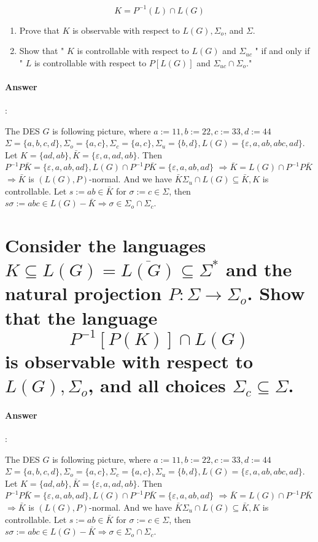 \documentclass{article}
\begin{document}
$$
K=P^{-1}(L) \cap L(G)
$$

\begin{enumerate}
  \item Prove that $K$ is observable with respect to $L(G), \Sigma_o$, and $\Sigma$.
  \item Show that " $K$ is controllable with respect to $L(G)$ and $\Sigma_{u c}$ " if and only if " $L$ is controllable with respect to $P[L(G)]$ and $\Sigma_{u c} \cap \Sigma_o$."
\end{enumerate}

\paragraph{Answer}:

The DES $G$ is following picture, where $a:=11, b:=22, c:=33, d:=44$ $\Sigma=\{a, b, c, d\}, \Sigma_o=\{a, c\}, \Sigma_c=\{a, c\}, \Sigma_u=\{b, d\}, L(G)=\{\varepsilon, a, a b, a b c, a d\}$. Let $K=\{a d, a b\}, \bar{K}=\{\varepsilon, a, a d, a b\}$.
Then $P^{-1} P \bar{K}=\{\varepsilon, a, a b, a d\}, L(G) \cap P^{-1} P \bar{K}=\{\varepsilon, a, a b, a d\}$
$\Longrightarrow \bar{K}=L(G) \cap P^{-1} P \bar{K}$
$\Longrightarrow \bar{K}$ is $(L(G), P)$-normal.
And we have $\bar{K} \Sigma_u \cap L(G) \subseteq \bar{K}, K$ is controllable. Let $s:=a b \in \bar{K}$ for $\sigma:=c \in \Sigma$, then $s \sigma:=a b c \in L(G)-\bar{K} \Longrightarrow \sigma \in \Sigma_o \cap \Sigma_c$.

\section{Consider the languages $K \subseteq L(G)=\overline{L(G)} \subseteq \Sigma^*$ and the natural projection $P: \Sigma \rightarrow \Sigma_o$. Show that the language
$$
P^{-1}[P(K)] \cap L(G)
$$
is observable with respect to $L(G), \Sigma_o$, and all choices $\Sigma_c \subseteq \Sigma$.}

\paragraph{Answer}:

The DES $G$ is following picture, where $a:=11, b:=22, c:=33, d:=44$ $\Sigma=\{a, b, c, d\}, \Sigma_o=\{a, c\}, \Sigma_c=\{a, c\}, \Sigma_u=\{b, d\}, L(G)=\{\varepsilon, a, a b, a b c, a d\}$. Let $K=\{a d, a b\}, \bar{K}=\{\varepsilon, a, a d, a b\}$.
Then $P^{-1} P \bar{K}=\{\varepsilon, a, a b, a d\}, L(G) \cap P^{-1} P \bar{K}=\{\varepsilon, a, a b, a d\}$
$\Longrightarrow \bar{K}=L(G) \cap P^{-1} P \bar{K}$
$\Longrightarrow \bar{K}$ is $(L(G), P)$-normal.
And we have $\bar{K} \Sigma_u \cap L(G) \subseteq \bar{K}, K$ is controllable. Let $s:=a b \in \bar{K}$ for $\sigma:=c \in \Sigma$, then $s \sigma:=a b c \in L(G)-\bar{K} \Longrightarrow \sigma \in \Sigma_o \cap \Sigma_c$.
\end{document}
